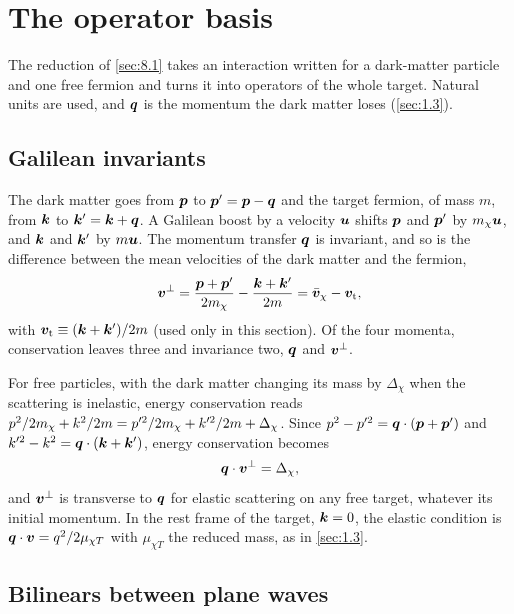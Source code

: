 \section{The operator basis}\label{app:D.24}

The reduction of \cref{sec:8.1} takes an interaction written for a dark-matter particle and one free fermion and turns it into operators of the whole target. Natural units are used, and $\bm{q}$ is the momentum the dark matter loses (\cref{sec:1.3}).

\subsection{Galilean invariants}

The dark matter goes from $\bm{p}$ to $\bm{p}' = \bm{p} - \bm{q}$ and the target fermion, of mass $m$, from $\bm{k}$ to $\bm{k}' = \bm{k} + \bm{q}$. A Galilean boost by a velocity $\bm{u}$ shifts $\bm{p}$ and $\bm{p}'$ by $m_{\chi}\bm{u}$, and $\bm{k}$ and $\bm{k}'$ by $m\bm{u}$. The momentum transfer $\bm{q}$ is invariant, and so is the difference between the mean velocities of the dark matter and the fermion,
\begin{equation}
  \bm{v}^\perp = \frac{\bm{p} + \bm{p}'}{2m_{\chi}} - \frac{\bm{k} + \bm{k}'}{2m} = \bar{\bm{v}}_\chi - \bm{v}_{\mathrm{t}},
  \label{eq:D.24-vperp}
\end{equation}
with $\bm{v}_{\mathrm{t}} \equiv (\bm{k} + \bm{k}')/2m$ (used only in this section). Of the four momenta, conservation leaves three and invariance two, $\bm{q}$ and $\bm{v}^\perp$.

For free particles, with the dark matter changing its mass by $\Delta_\chi$ when the scattering is inelastic, energy conservation reads $p^2/2m_{\chi} + k^2/2m = p'^2/2m_{\chi} + k'^2/2m + \Delta_\chi$. Since $p^2 - p'^2 = \bm{q}\cdot(\bm{p} + \bm{p}')$ and $k'^2 - k^2 = \bm{q}\cdot(\bm{k} + \bm{k}')$, energy conservation becomes
\begin{equation}
  \bm{q}\cdot\bm{v}^\perp = \Delta_\chi ,
  \label{eq:D.24-free}
\end{equation}
and $\bm{v}^\perp$ is transverse to $\bm{q}$ for elastic scattering on any free target, whatever its initial momentum. In the rest frame of the target, $\bm{k} = 0$, the elastic condition is $\bm{q}\cdot\bm{v} = q^2/2\mu_{\chi T}$ with $\mu_{\chi T}$ the reduced mass, as in \cref{sec:1.3}.

\subsection{Bilinears between plane waves}


